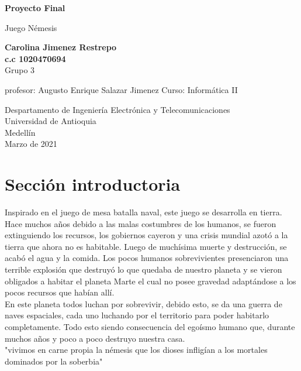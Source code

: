 \documentclass{article}
\begin{document}
\begin{titlepage}
    \begin{center}
        \vspace*{1cm}
            
        \Huge
        \textbf{Proyecto Final}
            
        \vspace{0.5cm}
        \LARGE
        Juego Némesis
            
        \vspace{1.5cm}
            
        \textbf{Carolina Jimenez Restrepo}\\
        \textbf   { c.c 1020470694}
          \\  Grupo 3
            
            \vspace{2.9cm}
         
                   profesor: Augusto Enrique Salazar Jimenez
                   Curso: Informática II
        \vfill
            
        \vspace{0.8cm}
            
        \Large
        Despartamento de Ingeniería Electrónica y Telecomunicaciones\\
        Universidad de Antioquia\\
        Medellín\\
        Marzo de 2021
            
    \end{center}
\end{titlepage}

\tableofcontents
\newpage
\section{Sección introductoria}\label{intro}
Inspirado en el juego de mesa batalla naval, este juego se desarrolla en tierra.\\
Hace muchos años debido a las malas costumbres de los humanos, se fueron extinguiendo los recursos, los gobiernos cayeron y una crisis mundial azotó a la tierra que ahora no es habitable.
Luego de muchísima muerte y destrucción, se acabó el agua y la comida.  Los pocos humanos sobrevivientes presenciaron una terrible explosión que destruyó lo que quedaba de nuestro planeta y se vieron obligados a habitar el planeta Marte el cual no posee gravedad adaptándose a los pocos recursos que habían allí.\\
En este planeta todos luchan por sobrevivir, debido esto, se da una guerra de naves espaciales, cada uno luchando por el territorio para poder habitarlo completamente.
Todo esto siendo consecuencia del egoísmo humano que, durante muchos años y poco a poco destruyo nuestra casa.\\
"vivimos en carne propia la némesis que los dioses infligían a los mortales dominados por la soberbia"
\end{document}
